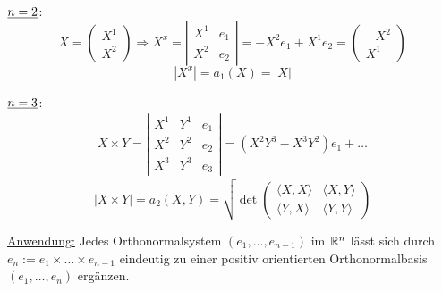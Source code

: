 \begin{bsp}{\(\uline{n=2}\):}
 \[ X=\begin{pmatrix}
       X^1 \\
       X^2
      \end{pmatrix}
      \Rightarrow X^x = \left\vert \begin{matrix}
                                    X^1 & e_1 \\
                                    X^2 & e_2
                                   \end{matrix}
			\right\vert
			= -X^2 e_1 + X^1 e_2 = \begin{pmatrix}
			                        -X^2 \\
			                        X^1
			                       \end{pmatrix}
\]
\[
 |X^x| = a_1(X) = |X|
\]
\end{bsp}

\begin{bsp}{\(\uline{n=3}\):}
  \begin{align*}
   X \times Y = \left\vert \begin{matrix}
                            X^1 & Y^1 & e_1 \\
                            X^2 & Y^2 & e_2 \\
                            X^3 & Y^3 & e_3
                           \end{matrix}
		\right\vert
		=(X^2Y^3-X^3Y^2) e_1 + \dots
  \end{align*}
\[
 |X \times Y| = a_2(X,Y) = \sqrt{\det \begin{pmatrix}
                                      \langle X,X\rangle & \langle X,Y\rangle \\
                                      \langle Y,X \rangle & \langle Y,Y\rangle
                                     \end{pmatrix}
}
\]
\end{bsp}

\uline{Anwendung:} Jedes Orthonormalsystem \((e_1, \dots, e_{n-1})\) im \(\mathbb{R}^n\) lässt sich durch \(e_n := e_1 \times \dots \times e_{n-1}\) eindeutig zu einer positiv orientierten Orthonormalbasis \((e_1, \dots, e_n)\) ergänzen.